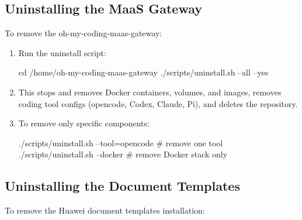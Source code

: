 \documentclass{guide}
\begin{document}
\subsection{Uninstalling the MaaS Gateway}

To remove the oh-my-coding-maas-gateway:

\stepbystep
\begin{enumerate}
  \item Run the uninstall script:
  \begin{code}[bash]
cd /home/oh-my-coding-maas-gateway
./scripts/uninstall.sh --all --yes
  \end{code}
  \item This stops and removes Docker containers, volumes, and images, removes
        coding tool configs (opencode, Codex, Claude, Pi), and deletes the
        repository.
  \item To remove only specific components:
  \begin{code}[bash]
./scripts/uninstall.sh --tool=opencode    # remove one tool
./scripts/uninstall.sh --docker           # remove Docker stack only
  \end{code}
\end{enumerate}

\subsection{Uninstalling the Document Templates}

To remove the Huawei document templates installation:
\end{document}
